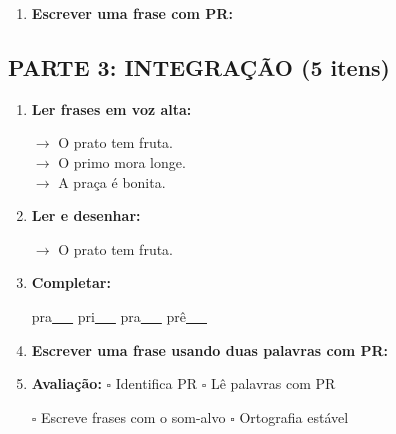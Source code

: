 \begin{exercicio}
\begin{enumerate}[resume]
  \item \textbf{Escrever uma frase com PR:}
  \begin{center}
  \underline{\hspace{12cm}}
  \end{center}

\end{enumerate}

\subsection*{PARTE 3: INTEGRAÇÃO (5 itens)}

\begin{enumerate}[resume]

  \item \textbf{Ler frases em voz alta:}
  \begin{center}
  $\rightarrow$ O prato tem fruta.\\
  $\rightarrow$ O primo mora longe.\\
  $\rightarrow$ A praça é bonita.\\
  \end{center}

  \item \textbf{Ler e desenhar:}
  \begin{center}
  $\rightarrow$ O prato tem fruta.
  \end{center}
  \begin{center}
  \end{center}

  \item \textbf{Completar:}
  \begin{center}
  pra\underline{~~~} \quad pri\underline{~~~} \quad pra\underline{~~~} \quad prê\underline{~~~}
  \end{center}

  \item \textbf{Escrever uma frase usando duas palavras com PR:}
  \begin{center}
  \underline{\hspace{12cm}}
  \end{center}

  \item \textbf{Avaliação:} $\square$ Identifica PR \quad $\square$ Lê palavras com PR
  \begin{center}
  $\square$ Escreve frases com o som-alvo \quad $\square$ Ortografia estável
  \end{center}


\end{enumerate}
\end{exercicio}
